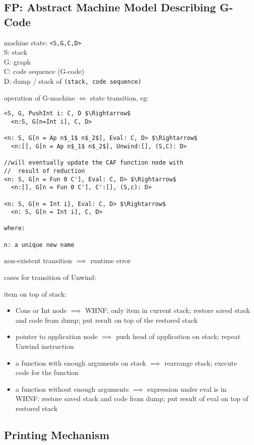 \documentclass[8pt]{extarticle}
\begin{document}
\begin{multicols*}{2}
\vfill\null
\columnbreak

\section{FP: Abstract Machine Model Describing G-Code}

machine state: \verb|<S,G,C,D>|\\
S: stack\\
G: graph\\
C: code sequence (G-code)\\
D: dump / stack of \verb|(stack, code sequence)|

operation of G-machine $\iff$ state transition, eg:

\begin{lstlisting}
<S, G, PushInt i: C, D $\Rightarrow$
  <n:S, G[n=Int i], C, D>

<n: S, G[n = Ap n$_1$ n$_2$], Eval: C, D> $\Rightarrow$
  <n:[], G[n = Ap n$_1$ n$_2$], Unwind:[], (S,C): D>

//will eventually update the CAF function node with
//  result of reduction
<n: S, G[n = Fun 0 C'], Eval: C, D> $\Rightarrow$
  <n:[], G[n = Fun 0 C'], C':[], (S,c): D>

<n: S, G[n = Int i], Eval: C, D> $\Rightarrow$
  <n: S, G[n = Int i], C, D>

where:

n: a unique new name
\end{lstlisting}

non-existent transition $\implies$ runtime error

cases for transition of Unwind:

item on top of stack:
\begin{itemize}
\item Cons or Int node $\implies$ WHNF; only item in current stack; restore saved stack and code from dump; put result on top of the restored stack
\item pointer to application node $\implies$ push head of application on stack; repeat Unwind instruction
\item a function with enough arguments on stack $\implies$ rearrange stack; execute code for the function
\item a function without enough arguments $\implies$ expression under eval is in WHNF; restore saved stack and code from dump; put result of eval on top of restored stack
\end{itemize}

\subsection{Printing Mechanism}


\end{multicols*}
\end{document}
